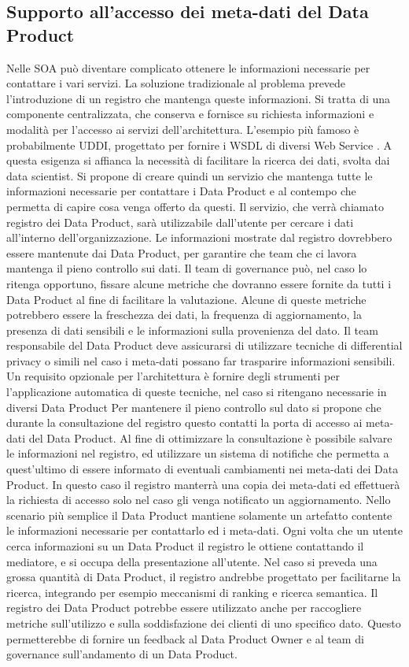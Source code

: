 \documentclass[12pt]{report}
\begin{document}
\subsection{Supporto all'accesso dei meta-dati del Data Product}
Nelle SOA può diventare complicato ottenere le informazioni necessarie per contattare i vari servizi.
La soluzione tradizionale al problema prevede l'introduzione di un registro che mantenga queste informazioni. 
Si tratta di una componente centralizzata, che conserva e fornisce su richiesta informazioni e modalità per l'accesso ai servizi dell'architettura.
L'esempio più famoso è probabilmente UDDI, progettato per fornire i WSDL di diversi Web Service \cite{curbera2002unraveling}.
A questa esigenza si affianca la necessità di facilitare  la ricerca dei dati, svolta dai data scientist.
Si propone di creare quindi un servizio che mantenga tutte le informazioni necessarie per contattare i Data Product e al contempo che permetta di capire cosa venga offerto da questi.
Il servizio, che verrà chiamato registro dei Data Product, sarà utilizzabile dall'utente per cercare i dati all'interno dell'organizzazione. 
Le informazioni mostrate dal registro dovrebbero essere mantenute dai Data Product, per garantire che team che ci lavora mantenga il pieno controllo sui dati.
Il team di governance può, nel caso lo ritenga opportuno, fissare alcune metriche che dovranno essere fornite da tutti i Data Product al fine di facilitare la valutazione.
Alcune di queste metriche potrebbero essere la freschezza dei dati, la frequenza di aggiornamento, la presenza di dati sensibili e le informazioni sulla provenienza del dato.
Il team responsabile del Data Product deve assicurarsi di utilizzare tecniche di differential privacy o simili nel caso i meta-dati possano far trasparire informazioni sensibili.
Un requisito opzionale per l'architettura è fornire degli strumenti per l'applicazione automatica di queste tecniche, nel caso si ritengano necessarie in diversi Data Product
Per mantenere il pieno controllo sul dato si propone che durante la consultazione del registro questo contatti la porta di accesso ai meta-dati del Data Product.
Al fine di ottimizzare la consultazione è possibile salvare le informazioni nel registro, ed utilizzare un sistema di notifiche che permetta a quest'ultimo di essere informato di eventuali cambiamenti nei meta-dati dei Data Product.
In questo caso il registro manterrà una copia dei meta-dati ed effettuerà la richiesta di accesso solo nel caso gli venga notificato un aggiornamento.
Nello scenario più semplice il Data Product mantiene solamente un artefatto contente le informazioni necessarie per contattarlo ed i meta-dati.
Ogni volta che un utente cerca informazioni su un Data Product il registro le ottiene contattando il mediatore, e si occupa della presentazione all'utente.
Nel caso si preveda una grossa quantità di Data Product, il registro andrebbe progettato per facilitarne la ricerca, integrando per esempio meccanismi di ranking e ricerca semantica.
Il registro dei Data Product potrebbe essere utilizzato anche per raccogliere metriche sull'utilizzo e sulla soddisfazione dei clienti di uno specifico dato.
Questo permetterebbe di fornire un feedback al Data Product Owner e al team di governance sull'andamento di un Data Product.
\end{document}
